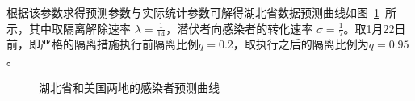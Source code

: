 \documentclass{whutmod}
\begin{document}
        根据该参数求得预测参数与实际统计参数可解得湖北省数据预测曲线如图~\ref{sd}~所示，其中取隔离解除速率 $\lambda =\frac{1}{14}$，潜伏者向感染者的转化速率 $\sigma=\frac{1}{7}$。取1月22日前，即严格的隔离措施执行前隔离比例$q=0.2$，取执行之后的隔离比例为$q=0.95$。
        \begin{figure}[H]
	\centering
	\caption{湖北省和美国两地的感染者预测曲线}\label{sd}
\end{figure}
\end{document}
